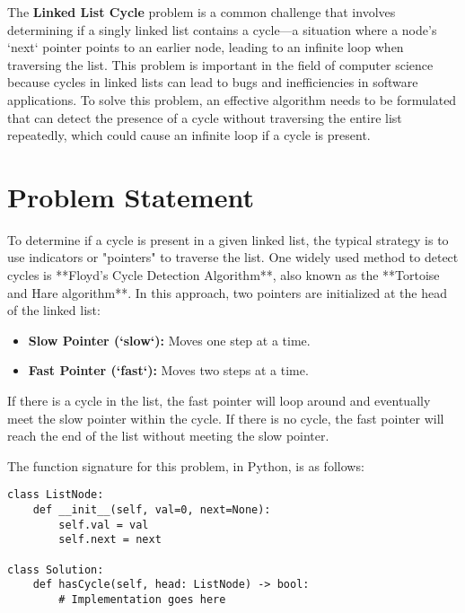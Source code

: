 
\label{problem:linked_list_cycle}

The \textbf{Linked List Cycle} problem is a common challenge that involves determining if a singly linked list contains a cycle—a situation where a node's `next` pointer points to an earlier node, leading to an infinite loop when traversing the list. This problem is important in the field of computer science because cycles in linked lists can lead to bugs and inefficiencies in software applications. To solve this problem, an effective algorithm needs to be formulated that can detect the presence of a cycle without traversing the entire list repeatedly, which could cause an infinite loop if a cycle is present.

\section*{Problem Statement}
To determine if a cycle is present in a given linked list, the typical strategy is to use indicators or "pointers" to traverse the list. One widely used method to detect cycles is **Floyd's Cycle Detection Algorithm**, also known as the **Tortoise and Hare algorithm**. In this approach, two pointers are initialized at the head of the linked list:

\begin{itemize}
    \item \textbf{Slow Pointer (`slow`):} Moves one step at a time.
    \item \textbf{Fast Pointer (`fast`):} Moves two steps at a time.
\end{itemize}

If there is a cycle in the list, the fast pointer will loop around and eventually meet the slow pointer within the cycle. If there is no cycle, the fast pointer will reach the end of the list without meeting the slow pointer.

The function signature for this problem, in Python, is as follows:

\begin{verbatim}
class ListNode:
    def __init__(self, val=0, next=None):
        self.val = val
        self.next = next

class Solution:
    def hasCycle(self, head: ListNode) -> bool:
        # Implementation goes here
\end{verbatim}

